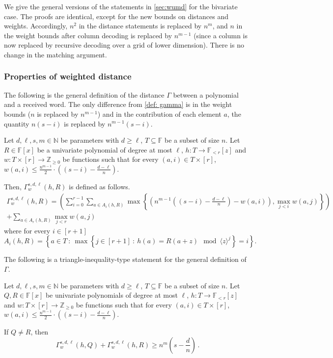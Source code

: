 \documentclass{theoretics}
\def\Integer{\mathbb{Z}}
\def\Natural{\mathbb{N}}
\def\Field{\mathbb{F}}
\let\N\Natural
\let\Z\Integer
\let\F\Field
\def\inbrace#1{\left\{ #1 \right\}}
\def\setdef#1#2{\inbrace{ #1 \ \colon \ #2}}      %
\begin{document}
	We give the general versions of the statements in \cref{sec:wumd} for the bivariate case. The proofs are identical, except for the new bounds on distances and weights. Accordingly, $n^2$ in the distance statements is replaced by $n^m$, and $n$ in the weight bounds after column decoding is replaced by $n^{m-1}$ (since a column is now replaced by recursive decoding over a grid of lower dimension). There is no change in the matching argument. 
	
	\subsubsection{Properties of weighted distance}
	
	The following is the general definition of the distance $\Gamma$
	between a polynomial and a received word. The only difference from
	\cref{def: gamma} is in the weight bounds ($n$ is replaced by
	$n^{m-1}$) and in the contribution of each element $a$, the quantity $n(s-i)$ is replaced by $n^{m-1}(s-i)$. 
	
	\begin{definition} \label{def:multivariate gamma}
		Let $d, \ell, s, m \in \N$ be parameters with $d \geq \ell$, $T
		\subseteq \F$ be a subset of size $n$. Let $R \in \F[x]$ be a
		univariate polynomial of degree at most $\ell$, $h\colon T \to
		\F_{<r}[z]$ and $w\colon  T \times [r] \to \Z_{\geq 0}$ be functions
		such that for every $(a, i) \in T \times [r]$, $w(a,i) \leq
		\frac{n^{m-1}}{2}\cdot \left((s-i) - \frac{d-\ell}{n}\right)$. 
		
		Then, $\Gamma_w^{s, d, \ell}(h, R)$ is defined as follows. 
		\begin{multline*}
		\Gamma_w^{s, d, \ell}(h, R) =  \left(\sum_{i = 0}^{r-1}\sum_{a \in A_i(h,R)} \max \left\{\left(n^{m-1}\left((s-i) - \frac{d-\ell}{n}\right) - w(a,i)\right), \max_{j < i} w(a, j) \right\}\right)\\
        + \sum_{a\in A_r(h,R)} \max_{j < r} w(a, j)
		\end{multline*}
		where for every $i \in [r+1]$
		\[
		A_i(h,R)=\setdef{a\in T}{\max{\setdef{j\in [r+1]}{h(a)=R(a+z) \mod \langle z\rangle^{j}}}=i}.
		\]
		
	\end{definition}
	
	The following is a triangle-inequality-type statement for the general definition of $\Gamma$. 
	
	\begin{lemma}
		Let $d, \ell, s, m \in \N$ be parameters with $d \geq \ell$, $T
		\subseteq \F$ be a subset of size $n$. Let $Q, R \in \F[x]$ be
		univariate polynomials of degree at most $\ell$, $h\colon T \to
		\F_{<r}[z]$ and $w\colon  T \times [r] \to \Z_{\geq 0}$ be functions
		such that for every $(a, i) \in T \times [r]$, $w(a,i) \leq
		\frac{n^{m-1}}{2}\cdot \left((s-i) - \frac{d-\ell}n\right)$. 
		
		If $Q \neq R$, then 
		\[
		\Gamma_w^{s,d,\ell}(h, Q) + \Gamma_w^{s,d,\ell}(h, R) \geq n^{m}\left(s - \frac{d}n\right) \, .
		\]
	\end{lemma}
	
\end{document}
